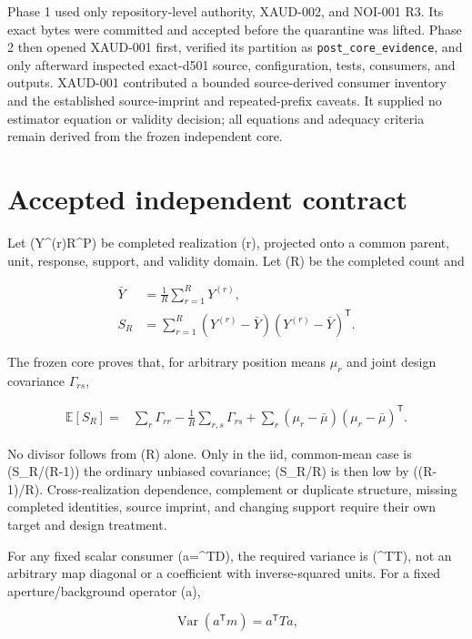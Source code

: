\documentclass[11pt]{article}
\newcommand{\E}{\mathbb{E}}
\newcommand{\Var}{\operatorname{Var}}
\newcommand{\code}[1]{\nolinkurl{#1}}
\begin{document}
Phase 1 used only repository-level authority, XAUD-002, and NOI-001 R3.  Its
exact bytes were committed and accepted before the quarantine was lifted.
Phase 2 then opened XAUD-001 first, verified its partition as
\code{post_core_evidence}, and only afterward inspected exact-d501 source,
configuration, tests, consumers, and outputs.  XAUD-001 contributed a bounded
source-derived consumer inventory and the established source-imprint and
repeated-prefix caveats.  It supplied no estimator equation or validity
decision; all equations and adequacy criteria remain derived from the frozen
independent core.

\section{Accepted independent contract}

Let (Y^{(r)}\in\mathbb R^P) be completed realization (r), projected onto a
common parent, unit, response, support, and validity domain.  Let (R) be the
completed count and

\begin{align}
 \bar Y &= \frac1R\sum_{r=1}^{R}Y^{(r)},\\
 S_R &= \sum_{r=1}^{R}(Y^{(r)}-\bar Y)
                    (Y^{(r)}-\bar Y)^{\mathsf T}.
 \label{eq:audit-scatter}
\end{align}

The frozen core proves that, for arbitrary position means \(\mu_r\) and joint
design covariance \(\Gamma_{rs}\),

\begin{align}
 \E[S_R]={}&\sum_r\Gamma_{rr}
 -\frac1R\sum_{r,s}\Gamma_{rs}
 +\sum_r(\mu_r-\bar\mu)(\mu_r-\bar\mu)^{\mathsf T}.
 \label{eq:audit-general-expectation}
\end{align}

No divisor follows from (R) alone.  Only in the iid, common-mean case is
(S_R/(R-1)) the ordinary unbiased covariance; (S_R/R) is then low by
((R-1)/R).  Cross-realization dependence, complement or duplicate structure,
missing completed identities, source imprint, and changing support require
their own target and design treatment.

For any fixed scalar consumer (a=\ell^{\mathsf T}D), the required variance is
(\ell^{\mathsf T}T\ell), not an arbitrary map diagonal or a coefficient with
inverse-squared units.  For a fixed aperture/background operator (a),

\begin{equation}
 \Var(a^{\mathsf T}m)=a^{\mathsf T}Ta,
 \label{eq:audit-aperture}
\end{equation}
\end{document}
